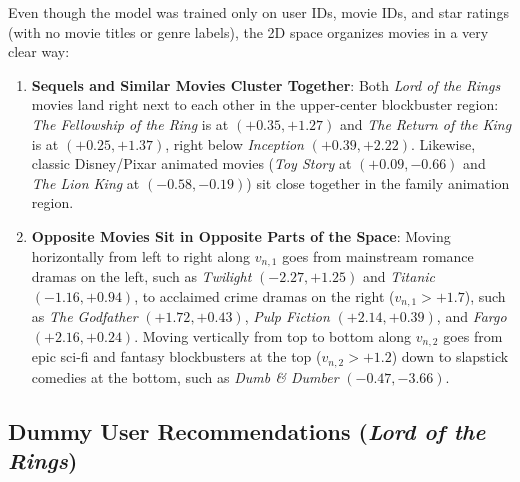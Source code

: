 \documentclass{article}
\theoremstyle{plain}
\theoremstyle{definition}
\begin{document}
Even though the model was trained only on user IDs, movie IDs, and star ratings (with no movie titles or genre labels), the 2D space organizes movies in a very clear way:
\begin{enumerate}
    \item \textbf{Sequels and Similar Movies Cluster Together}: Both \emph{Lord of the Rings} movies land right next to each other in the upper-center blockbuster region: \emph{The Fellowship of the Ring} is at $(+0.35, +1.27)$ and \emph{The Return of the King} is at $(+0.25, +1.37)$, right below \emph{Inception} $(+0.39, +2.22)$. Likewise, classic Disney/Pixar animated movies (\emph{Toy Story} at $(+0.09, -0.66)$ and \emph{The Lion King} at $(-0.58, -0.19)$) sit close together in the family animation region.
    \item \textbf{Opposite Movies Sit in Opposite Parts of the Space}: Moving horizontally from left to right along $v_{n,1}$ goes from mainstream romance dramas on the left, such as \emph{Twilight} $(-2.27, +1.25)$ and \emph{Titanic} $(-1.16, +0.94)$, to acclaimed crime dramas on the right ($v_{n,1} > +1.7$), such as \emph{The Godfather} $(+1.72, +0.43)$, \emph{Pulp Fiction} $(+2.14, +0.39)$, and \emph{Fargo} $(+2.16, +0.24)$. Moving vertically from top to bottom along $v_{n,2}$ goes from epic sci-fi and fantasy blockbusters at the top ($v_{n,2} > +1.2$) down to slapstick comedies at the bottom, such as \emph{Dumb \& Dumber} $(-0.47, -3.66)$.
\end{enumerate}

\subsection{Dummy User Recommendations (\emph{Lord of the Rings})}
\end{document}
